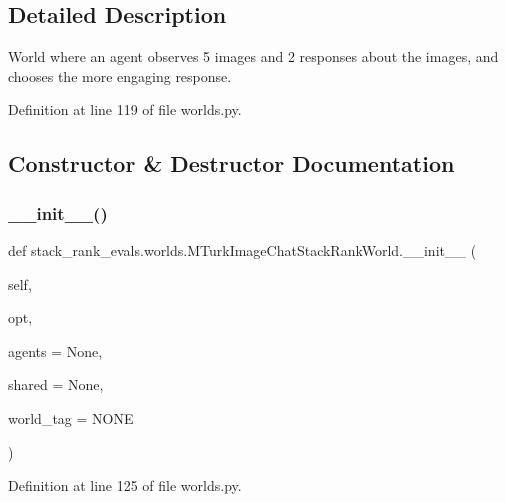 \subsection{Detailed Description}
\begin{DoxyVerb}World where an agent observes 5 images and 2 responses about the images, and chooses
the more engaging response.
\end{DoxyVerb}
 

Definition at line 119 of file worlds.\+py.



\subsection{Constructor \& Destructor Documentation}
\mbox{\label{classstack__rank__evals_1_1worlds_1_1MTurkImageChatStackRankWorld_aee5ebf396ed850b0121c2bfb3cb871d3}} 
\subsubsection{\texorpdfstring{\+\_\+\+\_\+init\+\_\+\+\_\+()}{\_\_init\_\_()}}
{\footnotesize\ttfamily def stack\+\_\+rank\+\_\+evals.\+worlds.\+M\+Turk\+Image\+Chat\+Stack\+Rank\+World.\+\_\+\+\_\+init\+\_\+\+\_\+ (\begin{DoxyParamCaption}\item[{}]{self,  }\item[{}]{opt,  }\item[{}]{agents = {\ttfamily None},  }\item[{}]{shared = {\ttfamily None},  }\item[{}]{world\+\_\+tag = {\ttfamily \textquotesingle{}NONE\textquotesingle{}} }\end{DoxyParamCaption})}



Definition at line 125 of file worlds.\+py.


